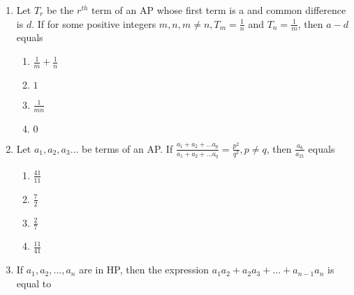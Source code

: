 \begin{enumerate}    [label=\thesubsection.\arabic*, ref=\thesubsection.\theenumi]
{\hfill{}}
\begin{multicols}{4}
\begin{enumerate}    
\item  {$\log_3 4$}
 \item {$1-\log_3 4$}
 \item {$1-\log_4 3$}
 \item {$\log_4 3$}
\end{enumerate}
\end{multicols}
%
\item {Let $T_r$ be the $r^{th}$ term of an AP whose first term is a and common difference is $d$. If for some positive integers $m, n,  m\neq n,  T_m = \frac{1}{n}$ and $T_n = \frac{1}{m}$,  then $a-d$ equals} 
{\hfill{}}
\begin{multicols}{4}
\begin{enumerate}    
\item  {$\frac{1}{m}+\frac{1}{n}$}
\item  {$1$}
\item  {$\frac{1}{mn}$}
\item  {$0$}
\end{enumerate}
\end{multicols}
\item Let $a_1,  a_2,  a_3 \dots$ be terms of an AP. If $\frac{a_1+a_2+\dots a_p}{a_1+a_2+\dots a_q}= \frac{p^2}{q^2},  p \neq q$,  then $\frac{a_6}{a_{21}}$ equals
\hfill {}
\begin{multicols}{4}
\begin{enumerate}    
\item  {$\frac{41}{11}$}
\item  {$\frac{7}{2}$}
\item  {$\frac{2}{7}$}
\item  {$\frac{11}{41}$}
\end{enumerate}
\end{multicols}
    \item If $a_1, a_2, \dots, a_n$ are in HP,  then the expression $a_1a_2+a_2a_3+\dots+a_{n-1}a_n$ is equal to


\end{enumerate}
